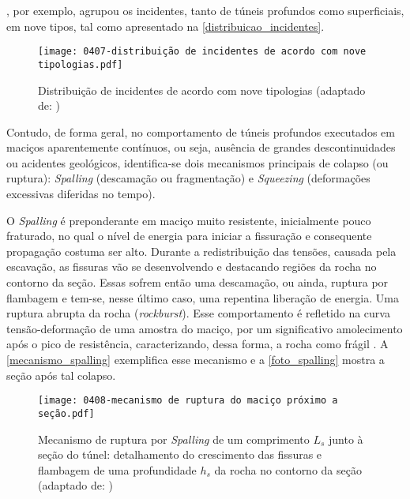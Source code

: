 , por exemplo, agrupou os incidentes, tanto de túneis profundos como superficiais, em nove tipos, tal como apresentado na \autoref{distribuicao_incidentes}.

\begin{figure}[H]
	\begin{center}
		\texttt{[image: 0407-distribuição de incidentes de acordo com nove tipologias.pdf]}
	\end{center}
	\caption{\label{distribuicao_incidentes}Distribuição de incidentes de acordo com nove tipologias (adaptado de: )}
\end{figure}

Contudo, de forma geral, no comportamento de túneis profundos executados em maciços aparentemente contínuos, ou seja, ausência de grandes descontinuidades ou acidentes geológicos, identifica-se dois mecanismos principais de colapso (ou ruptura): \textit{Spalling} (descamação ou fragmentação) e \textit{Squeezing} (deformações excessivas diferidas no tempo).

O \textit{Spalling} é preponderante em maciço muito resistente, inicialmente pouco fraturado, no qual o nível de energia para iniciar a fissuração e consequente propagação costuma ser alto. Durante a redistribuição das tensões, causada pela escavação, as fissuras vão se desenvolvendo e destacando regiões da rocha no contorno da seção. Essas sofrem então uma descamação, ou ainda, ruptura por flambagem e tem-se, nesse último caso, uma repentina liberação de energia. Uma ruptura abrupta da rocha (\textit{rockburst}). Esse comportamento é refletido na curva tensão-deformação de uma amostra do maciço, por um significativo amolecimento após o pico de resistência, caracterizando, dessa forma, a rocha como frágil \cite[p. 83]{Kleine2007}. A \autoref{mecanismo_spalling} exemplifica esse mecanismo e a \autoref{foto_spalling} mostra a seção após tal colapso.

\begin{figure}[H]
	\begin{center}
		\texttt{[image: 0408-mecanismo de ruptura do maciço próximo a seção.pdf]}
	\end{center}
	\caption{\label{mecanismo_spalling}Mecanismo de ruptura por \textit{Spalling} de um comprimento $L_s$ junto à seção do túnel: detalhamento do crescimento das fissuras e flambagem de uma profundidade $h_s$ da rocha no contorno da seção (adaptado de: )}
\end{figure}

